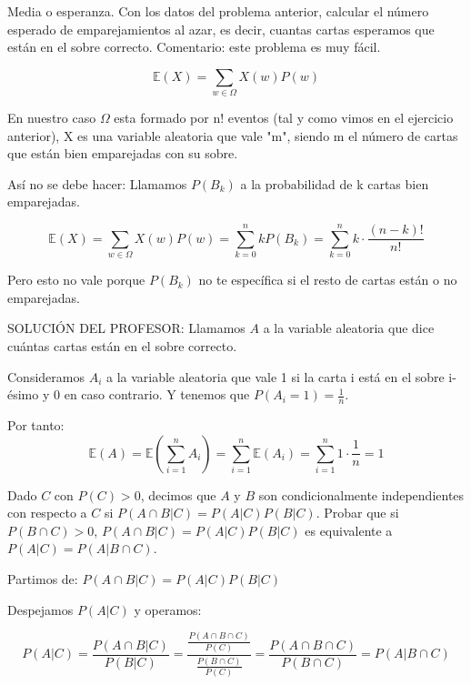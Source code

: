 \begin{problem}[12] Media o esperanza. Con los datos del problema anterior, calcular el n\'umero esperado de
emparejamientos al azar, es decir, cuantas cartas esperamos que est\'an en el sobre correcto.
Comentario: este problema es muy f\'acil.
\solution

\begin{expla}
\[
\mathbb{E}(X) = \sum_{w \in \Omega} X(w)P(w)
\]

En nuestro caso $\Omega$ esta formado por n! eventos (tal y como vimos en el ejercicio anterior), X es una variable aleatoria que vale "m", siendo m el número de cartas que están bien emparejadas con su sobre.

Así no se debe hacer: 
Llamamos $P(B_k)$ a la probabilidad de k cartas bien emparejadas. 

\[
\mathbb{E}(X) = \sum_{w \in \Omega} X(w)P(w) = \sum_{k=0}^n kP(B_k) = \sum_{k=0}^n k\cdot\frac{(n-k)!}{n!}
\]

Pero esto no vale porque $P(B_k)$ no te específica si el resto de cartas están o no emparejadas.
\end{expla}
SOLUCIÓN DEL PROFESOR:
Llamamos $A$ a la variable aleatoria que dice cuántas cartas están en el sobre correcto.

Consideramos $A_i$ a la variable aleatoria que vale 1 si la carta i está en el sobre i-ésimo y 0 en caso contrario. Y tenemos que $P(A_i=1)=\frac{1}{n}$.

Por tanto:
\[
\mathbb{E}(A)=\mathbb{E}({\sum_{i=1}^{n} A_i}) = \sum_{i=1}^n \mathbb{E}(A_i) = \sum_{i=1}^n 1 \cdot \frac{1}{n} = 1
\]




\end{problem}


\begin{problem}[13] Dado $C$ con $P(C) > 0$, decimos que $A$ y $B$ son condicionalmente independientes
con respecto a $C$ si $P(A\cap B|C) =P(A|C) P(B|C)$. Probar que si  $P(B\cap C) > 0$, 
$P(A\cap B|C) =P(A|C) P(B|C)$ es equivalente a $P(A|C) = P(A|B \cap C)$. 


\solution

\begin{expla}
Partimos de: $P(A\cap B|C)=P(A|C)P(B|C)$  

Despejamos $P(A|C)$ y operamos:
\end{expla}

\[
P(A|C)=\frac{P(A\cap B|C)}{P(B|C)}=\frac{\frac{P(A\cap B\cap C)}{P(C)}}{\frac{P(B \cap C)}{P(C)}}=\frac{P(A \cap B\cap C)}{P(B\cap C)}=P(A|B\cap C)
\]

\end{problem}

